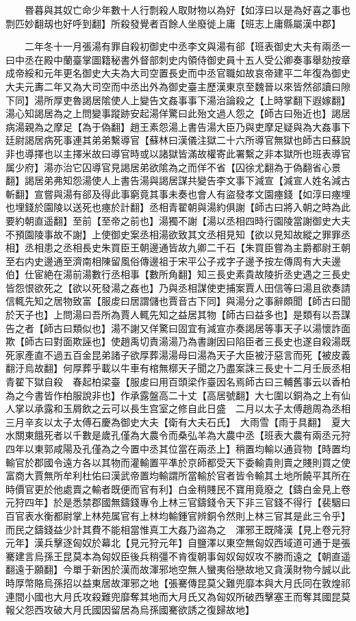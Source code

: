 　　昬暮與其奴亡命少年數十人行剽殺人取財物以為好【如淳曰以是為好喜之事也剽匹妙翻刼也好呼到翻】所殺發覺者百餘人坐廢徙上庸【班志上庸縣屬漢中郡】

　　二年冬十一月張湯有罪自殺初御史中丞李文與湯有郤【班表御史大夫有兩丞一曰中丞在殿中蘭臺掌圖籍秘書外督部刺史内領侍御史員十五人受公卿奏事舉劾按章成帝綏和元年更名御史大夫為大司空置長史而中丞官職如故哀帝建平二年復為御史大夫元夀二年又為大司空而中丞出外為御史臺主歷漢東京至魏晉以來皆然郤讀曰隙下同】湯所厚吏魯謁居隂使人上變告文姦事事下湯治論殺之【上時掌翻下遐嫁翻】湯心知謁居為之上問變事蹤跡安起湯佯驚曰此殆文過人怨之【師古曰殆近也】謁居病湯親為之摩足【為于偽翻】趙王素怨湯上書告湯大臣乃與吏摩足疑與為大姦事下廷尉謁居病死事連其弟弟繫導官【蘇林曰漢儀注獄二十六所導官無獄也師古曰蘇說非也導擇也以主擇米故曰導官時或以諸獄皆滿故權寄此署繫之非本獄所也班表導官属少府】湯亦治它囚導官見謁居弟欲隂為之而佯不省【囚徐尤翻為于偽翻省心景翻】謁居弟弗知怨湯使人上書告湯與謁居謀共變告李文事下減宣【減宣人姓名減古斬翻】宣嘗與湯有郤及得此事窮竟其事未奏也會人有盜發孝文園瘞錢【如淳曰瘞埋也埋錢於園陵以送死也瘞於計翻】丞相青翟朝與湯約俱謝【師古曰將入朝之時為此要約朝直遥翻】至前【至帝之前也】湯獨不謝【湯以丞相四時行園陵當謝御史大夫不預園陵事故不謝】上使御史案丞相湯欲致其文丞相見知【欲以見知故縱之罪罪丞相】丞相患之丞相長史朱買臣王朝邊通皆故九卿二千石【朱買臣嘗為主爵都尉王朝至右内史邊通至濟南相陳留風俗傳邊祖于宋平公子戎字子邊予按左傳周有大夫邊伯】仕宦絶在湯前湯數行丞相事【數所角翻】知三長史素貴故陵折丞史遇之三長史皆怨恨欲死之【欲以死發湯之姦也】乃與丞相謀使吏捕案賈人田信等曰湯且欲奏請信輒先知之居物致富【服䖍曰居謂儲也賈音古下同】與湯分之事辭頗聞【師古曰聞於天子也】上問湯曰吾所為賈人輒先知之益居其物【師古曰益多也】是類有以吾謀告之者【師古曰類似也】湯不謝又佯驚曰固宜有減宣亦奏謁居等事天子以湯懷詐面欺【師古曰對面欺誣也】使趙禹切責湯湯乃為書謝因曰陷臣者三長史也遂自殺湯既死家產直不過五百金昆弟諸子欲厚葬湯湯母曰湯為天子大臣被汙惡言而死【被皮義翻汙烏故翻】何厚葬乎載以牛車有棺無槨天子聞之乃盡案誅三長史十二月壬辰丞相青翟下獄自殺　春起柏梁臺【服䖍曰用百頭梁作臺因名焉師古曰三輔舊事云以香柏為之今書皆作柏服說非也】作承露盤高二十丈【高居號翻】大七圍以銅為之上有仙人掌以承露和玉屑飲之云可以長生宫室之修自此日盛　二月以太子太傅趙周為丞相　三月辛亥以太子太傅石慶為御史大夫【衛有大夫石氏】　大雨雪【雨于具翻】　夏大水關東餓死者以千數是歲孔僅為大農令而桑弘羊為大農中丞【班表大農有兩丞元狩四年以東郭咸陽及孔僅為之今置中丞其位當在兩丞上】稍置均輸以通貨物【時置均輸官於郡國令遠方各以其物而灌輸置平凖於京師都受天下委輸貴則賣之賤則買之使富商大賈無所牟利杜佑曰漢武帝置均輸謂所當輸於官者皆令輸其土地所饒平其所在時價官更於他處賣之輸者既便而官有利】白金稍賤民不寶用竟廢之【鑄白金見上卷元狩四年】於是悉禁郡國無鑄錢專令上林三官鑄錢令天下非三官錢不得行【裴駰曰百官表水衡都尉掌上林苑属官有上林均輸鍾官辨銅令然則上林三官其是此三令乎】而民之鑄錢益少計其費不能相當惟真工大姦乃盜為之　渾邪王既降漢【見上卷元狩元年】漢兵擊逐匈奴於幕北【見元狩元年】自鹽澤以東空無匈奴西域道可通于是張騫建言烏孫王昆莫本為匈奴臣後兵稍彊不肯復朝事匈奴匈奴攻不勝而遠之【朝直遥翻遠于願翻】今單于新困於漢而故渾邪地空無人蠻夷俗戀故地又貪漢財物今誠以此時厚幣賂烏孫招以益東居故渾邪之地【張騫傳昆莫父難兜靡本與大月氏同在敦煌祁連間小國也大月氏攻殺難兜靡奪其地而大月氏又為匈奴所破西擊塞王而奪其國昆莫報父怨西攻破大月氏國因留居為烏孫國騫欲誘之復歸故地】